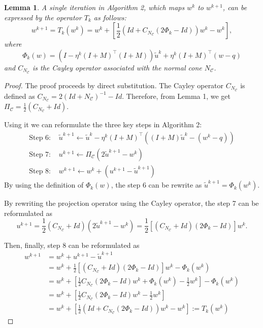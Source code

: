 \documentclass[10pt]{article} %
\newtheorem{lemma}[thm]{Lemma}
\begin{document}
\begin{lemma}
\label{lem:T_k}
A single iteration in Algorithm 2, which maps $w^k$ to $w^{k+1}$, can be expressed by the operator $T_k$ as follows:
$$
w^{k+1} = T_k(w^k) = w^k + \left[\frac{1}{2}(Id + C_{N_\mathcal{C}}(2\Phi_k -Id))w^k - w^k\right],
$$
where 
$$
\Phi_k(w) = \left(I - \eta^k (I+M)^\top (I+M)\right)\tilde{u}^k + \eta^k (I+M)^\top (w-q)
$$ and $C_{N_\mathcal{C}}$ is the Cayley operator associated with the normal cone $N_{\mathcal{C}}$.
\end{lemma}
\begin{proof}
The proof proceeds by direct substitution.
The Cayley operator $C_{N_\mathcal{C}}$ is defined as $C_{N_\mathcal{C}} = 2(Id + N_{\mathcal{C}})^{-1} - Id$.
Therefore, from Lemma 1, we get $\Pi_\mathcal{C} = \frac{1}{2}(C_{N_\mathcal{C}} + Id)$.

Using it we can reformulate the three key steps in Algorithm 2:
$$
\begin{aligned}
\text{Step 6: }& \tilde{u}^{k+1} \gets \tilde{u}^k - \eta^k(I+M)^\top ((I+M)\tilde{u}^k - (w^k-q))\\
\text{Step 7: }& u^{k+1} \gets \Pi_\mathcal{C}\left(2 \tilde{u}^{k+1} - w^k\right)\\
\text{Step 8: }& w^{k+1} \gets w^k + \left(u^{k+1} - \tilde{u}^{k+1}\right)
\end{aligned}
$$
By using the definition of $\Phi_k(w)$, the step 6 can be rewrite as $\tilde{u}^{k+1} = \Phi_k(w^k)$.  

By rewriting the projection operator using the Cayley operator, the step 7 can be reformulated as 
$$
u^{k+1} = \frac{1}{2}(C_{N_\mathcal{C}} + Id)(2\tilde{u}^{k+1}-w^k) = \frac{1}{2}\left[(C_{N_\mathcal{C}} + Id)(2\Phi_k - Id)\right]w^k.
$$

Then, finally, step 8 can be reformulated as
$$
\begin{aligned}
w^{k+1} &= w^k + u^{k+1} - \tilde{u}^{k+1} \\
&= w^k + \frac{1}{2}\left[(C_{N_\mathcal{C}} + Id)(2\Phi_k - Id)\right]w^k - \Phi_k(w^k) \\
&= w^k + \left[\frac{1}{2}C_{N_\mathcal{C}}(2\Phi_k - Id)w^k + \Phi_k(w^k) - \frac{1}{2}w^k\right] - \Phi_k(w^k) \\
&= w^k + \left[\frac{1}{2}C_{N_\mathcal{C}}(2\Phi_k - Id)w^k  - \frac{1}{2}w^k\right] \\
&= w^k + \left[\frac{1}{2}(Id + C_{N_\mathcal{C}}(2\Phi_k -Id))w^k - w^k\right] := T_k(w^k)
\end{aligned}
$$
\end{proof}
\end{document}
